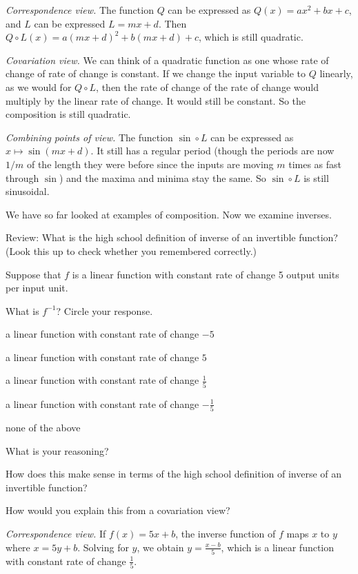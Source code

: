\documentclass[11pt]{article}
\newenvironment{task}
	{\begin{mdframed}[linecolor=lightgray, linewidth=3pt]\raggedright}
	{\end{mdframed}}
\theoremstyle{definition}
\begin{document}
{\it Correspondence view.} The function $Q$ can be expressed as $Q(x)=ax^2+bx+c$, and $L$ can be expressed $L=mx+d$. Then $Q\circ L(x) = a(mx+d)^2+b(mx+d)+c$, which is still quadratic.  

{\it Covariation view.} We can think of a quadratic function as one whose rate of change of rate of change is constant. If we change the input variable to $Q$ linearly, as we would for $Q\circ L$, then the rate of change of the rate of change would multiply by the linear rate of change. It would still be constant. So the composition is still quadratic.

{\it Combining points of view.}
The function $\sin \circ L$ can be expressed as $x\mapsto \sin(mx+d)$. It still has a regular period (though the periods are now $1/m$ of the length they were before since the inputs are moving $m$ times as fast through $\sin$) and the maxima and minima stay the same. So $\sin\circ L$ is still sinusoidal.

We have so far looked at examples of composition. Now we examine inverses.

\begin{task}
Review: What is the high school definition of inverse of an invertible function? (Look this up to check whether you remembered correctly.)
\end{task}

\begin{task}
Suppose that $f$ is a linear function with constant rate of change 5 output units per input unit. 

What is $f^{-1}$? Circle your response. 
	\begin{center}
	a linear function with constant rate of change $-5$   
		
	a linear function with constant rate of change $5$  
	
	a linear function with constant rate of change $\frac{1}{5}$ 
	
	a linear function with constant rate of change $-\frac{1}{5}$ 
		
	none of the above
	\end{center}
What is your reasoning?

How does this make sense in terms of the high school definition of inverse of an invertible function?

How would you explain this from a covariation view? 
\end{task}

{\it Correspondence view.}  If $f(x)=5x+b$, the inverse function of $f$ maps $x$ to $y$ where $x=5y+b$. Solving for $y$, we obtain $y=\frac{x-b}{5}$, which is a linear function with constant rate of change $\frac{1}{5}$.
\end{document}

